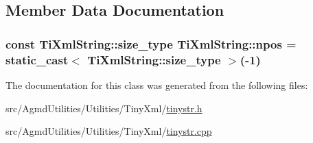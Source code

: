 \subsection{Member Data Documentation}
\hypertarget{class_ti_xml_string_a8f4422d227088dc7bec96f479b275d0a}{
\subsubsection[{npos}]{\setlength{\rightskip}{0pt plus 5cm}const {\bf Ti\+Xml\+String\+::size\+\_\+type} Ti\+Xml\+String\+::npos = static\+\_\+cast$<$ {\bf Ti\+Xml\+String\+::size\+\_\+type} $>$(-\/1)\hspace{0.3cm}{\ttfamily [static]}}}\label{class_ti_xml_string_a8f4422d227088dc7bec96f479b275d0a}


The documentation for this class was generated from the following files\+:\begin{DoxyCompactItemize}
\item 
src/\+Agmd\+Utilities/\+Utilities/\+Tiny\+Xml/\hyperlink{tinystr_8h}{tinystr.\+h}\item 
src/\+Agmd\+Utilities/\+Utilities/\+Tiny\+Xml/\hyperlink{tinystr_8cpp}{tinystr.\+cpp}\end{DoxyCompactItemize}
